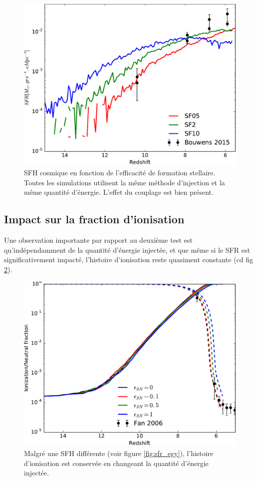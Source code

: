 \begin{figure}
        \includegraphics[width=.95\textwidth]{img/03/sedov/SFR_sfeff.pdf} 
        \caption[SFH cosmique en fonction de l'efficacité de formation stellaire]{SFH cosmique en fonction de l'efficacité de formation stellaire.
        Toutes les simulations utilisent la même méthode d'injection et la même quantité d'énergie.
		L'effet du couplage est bien présent.
        }
 		\label{fig:sfr_sfe}
\end{figure}

\subsection{Impact sur la fraction d'ionisation}
\label{sec:pbfesc}
Une observation importante par rapport au deuxième test est qu’indépendamment de la quantité d'énergie injectée, et que même si le \ac{SFR} est significativement impacté, l'histoire d'ionisation reste quasiment constante (cd fig \ref{fig:xion_sneff}).

\begin{figure}
        \includegraphics[width=.95\textwidth]{img/03/sneff_xion.pdf} 
        \caption[Fonction d'ionisation en fonction de la quantité d'énergie injectée]{Malgré une SFH différente (voir figure \ref{fig:sfr_egy}), l'histoire d'ionisation est conservée en changeant la quantité d'énergie injectée.
        }
 		\label{fig:xion_sneff}
\end{figure}

